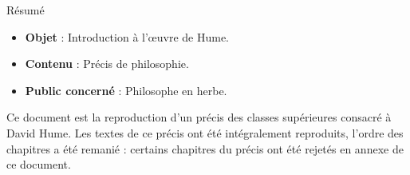 \begin{center}
\Large
Résumé
\normalsize
\end{center}
\vspace{3cm}
\begin{itemize}[leftmargin=1cm, label=, itemsep=21pt]
\item {\bf Objet}  : Introduction à l'œuvre de Hume.
\item {\bf Contenu}  : Précis de philosophie.
\item {\bf Public concerné} : Philosophe en herbe.
\end{itemize}

\vspace{3cm}

Ce document est la reproduction d'un précis des classes supérieures consacré à David Hume. Les textes de ce précis ont été intégralement reproduits, l'ordre des chapitres a été remanié : certains chapitres du précis ont été rejetés en annexe de ce document.

\vspace{3cm}

